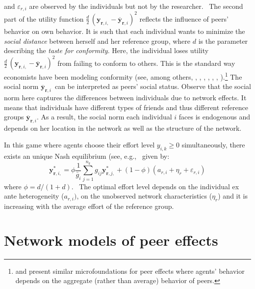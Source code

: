 \documentclass[nojss]{jss}
\begin{document}
and $\varepsilon _{r, i}$ are observed by the individuals but not by the
researcher.  \ The second part of the utility function
$\frac{d}{2}\,(\mathbf{y}_{\mathbf{r},
i,}-\overline{\mathbf{y}}_{\mathbf{r}, i})^2$ reflects the influence of
peers' behavior on own behavior.  It is such that each individual wants to
minimize the \emph{social distance} between herself and her reference group,
where $d$ is the parameter describing the \emph{taste for conformity}. 
Here, the individual loses utility $\frac{d}{2}\,(\mathbf{y}_{\mathbf{r},
i,}-\overline{\mathbf{y}}_{\mathbf{r}, i})^2$ from failing to conform to
others.  This is the standard way economists have been modeling conformity
(see, among others, \citealp{Akerlof1980}, \citealp{Bernheim1994},
\citealp{Kandel1992}, \citealp{Akerlof1997}, \citealp{Fershtman1998},
\citealp{Patacchini2012},
\citealp{PatacchiniRainone2012}).\footnote{\cite{Ballester+Armengol+Zenou:2006}
and \cite{Armengol2009} present similar microfoundations for peer effects
where agents' behavior depends on the aggregate (rather than average)
behavior of peers.} The social norm $\overline{\mathbf{y}}_{\mathbf{r}, i}$\
can be interpreted as peers' social status.  Observe that the social norm
here captures the differences between individuals due to network effects. 
It means that individuals have different types of friends and thus different
reference groups $\overline{\mathbf{y}}_{\mathbf{r}, i}$.  As a result, the
social norm each individual $i$ faces is endogenous and depends on her
location in the network as well as the structure of the network.

In this game where agents choose their effort level $y_{i,k}\geq 0$
simultaneously, there exists an unique Nash equilibrium (see, e.g.,~\cite{Patacchini2012} given by:%
%
\begin{equation*}
\mathbf{y}_{\mathbf{r}, i,}^{\ast }=\phi \frac{1}{\bar g_{i}}\sum_{j=1}^{n_{k}}g_{ij}\mathbf{y}_{\mathbf{r}, j,}^{\ast
}+\left( 1-\phi \right) \left( a_{r, i}+\eta _{r}+\varepsilon _{r, i}\right) 
\label{FOC}
\end{equation*}%
%
where $\phi =d/(1+d)$. \ The optimal effort level depends on the individual
ex ante heterogeneity ($a_{r, i})$, on the unobserved network characteristics
($\eta _{r}$) and it is increasing with the average effort of the reference
group. 

\section{Network models of peer effects} \label{sec:models}
\end{document}
